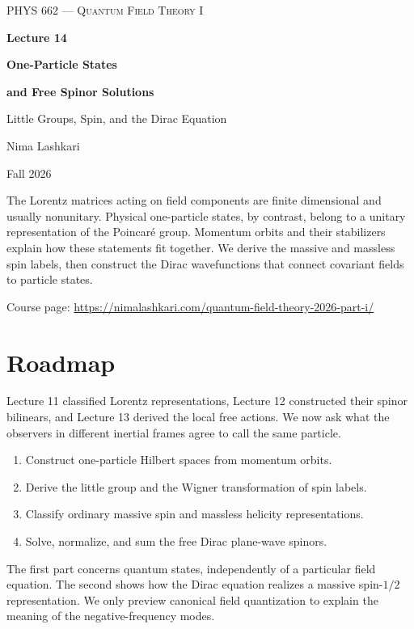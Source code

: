 \documentclass[11pt]{article}
\begin{document}
\begin{titlepage}
\centering
\vspace*{1.2in}
{\scshape\Large PHYS 662 --- Quantum Field Theory I\par}
\vspace{0.35in}
{\Huge\bfseries\color{qftblue} Lecture 14\par}
\vspace{0.15in}
{\LARGE\bfseries One-Particle States\par}
\vspace{0.06in}
{\LARGE\bfseries and Free Spinor Solutions\par}
\vspace{0.16in}
{\large\color{qftgreen} Little Groups, Spin, and the Dirac Equation\par}
\vspace{0.6in}
{\large Nima Lashkari\par}
{\large Fall 2026\par}
\vfill
\begin{minipage}{0.86\textwidth}\small
The Lorentz matrices acting on field components are finite dimensional
and usually nonunitary. Physical one-particle states, by contrast,
belong to a unitary representation of the Poincar\'e group. Momentum
orbits and their stabilizers explain how these statements fit together.
We derive the massive and massless spin labels, then construct the
Dirac wavefunctions that connect covariant fields to particle states.

\medskip
Course page: \url{https://nimalashkari.com/quantum-field-theory-2026-part-i/}
\end{minipage}
\vspace{0.5in}
\end{titlepage}
\begingroup\small\tableofcontents\endgroup
\newpage
{}

\section*{Roadmap}
Lecture 11 classified Lorentz representations, Lecture 12 constructed
their spinor bilinears, and Lecture 13 derived the local free actions. We now ask what the observers in different inertial
frames agree to call the same particle.
\begin{enumerate}
\item Construct one-particle Hilbert spaces from momentum orbits.
\item Derive the little group and the Wigner transformation of spin labels.
\item Classify ordinary massive spin and massless helicity representations.
\item Solve, normalize, and sum the free Dirac plane-wave spinors.
\end{enumerate}
The first part concerns quantum states, independently of a particular
field equation. The second shows how the Dirac equation realizes a
massive spin-\(1/2\) representation. We only preview canonical field
quantization to explain the meaning of the negative-frequency modes.
\end{document}
